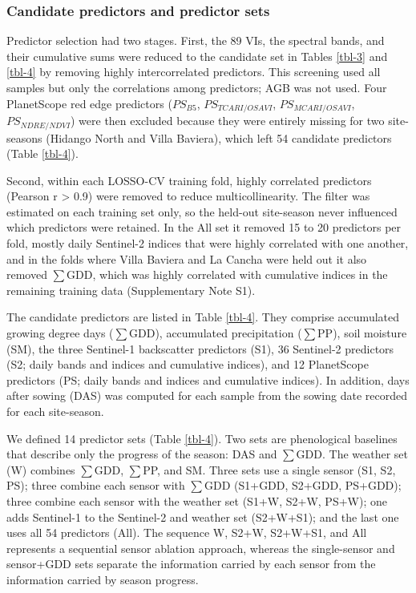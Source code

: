 \documentclass[
  english,
  review,
  number,
  sort,compress,
  authoryear,
  3p]{elsarticle}
\begin{document}
\subsubsection{Candidate predictors and predictor
sets}\label{candidate-predictors-and-predictor-sets}

Predictor selection had two stages. First, the 89 VIs, the spectral
bands, and their cumulative sums were reduced to the candidate set in
Tables \ref{tbl-3} and \ref{tbl-4} by removing highly intercorrelated
predictors. This screening used all samples but only the correlations
among predictors; AGB was not used. Four PlanetScope red edge predictors
(\(PS_{B5}\), \(PS_{TCARI/OSAVI}\), \(PS_{MCARI/OSAVI}\),
\(PS_{NDRE/NDVI}\)) were then excluded because they were entirely
missing for two site-seasons (Hidango North and Villa Baviera), which
left 54 candidate predictors (Table \ref{tbl-4}).

Second, within each LOSSO-CV training fold, highly correlated predictors
(Pearson r \textgreater{} 0.9) were removed to reduce multicollinearity.
The filter was estimated on each training set only, so the held-out
site-season never influenced which predictors were retained. In the All
set it removed 15 to 20 predictors per fold, mostly daily Sentinel-2
indices that were highly correlated with one another, and in the folds
where Villa Baviera and La Cancha were held out it also removed
\(\sum\)GDD, which was highly correlated with cumulative indices in the
remaining training data (Supplementary Note S1).

The candidate predictors are listed in Table \ref{tbl-4}. They comprise
accumulated growing degree days (\(\sum\)GDD), accumulated precipitation
(\(\sum\)PP), soil moisture (SM), the three Sentinel-1 backscatter
predictors (S1), 36 Sentinel-2 predictors (S2; daily bands and indices
and cumulative indices), and 12 PlanetScope predictors (PS; daily bands
and indices and cumulative indices). In addition, days after sowing
(DAS) was computed for each sample from the sowing date recorded for
each site-season.

We defined 14 predictor sets (Table \ref{tbl-4}). Two sets are
phenological baselines that describe only the progress of the season:
DAS and \(\sum\)GDD. The weather set (W) combines \(\sum\)GDD,
\(\sum\)PP, and SM. Three sets use a single sensor (S1, S2, PS); three
combine each sensor with \(\sum\)GDD (S1+GDD, S2+GDD, PS+GDD); three
combine each sensor with the weather set (S1+W, S2+W, PS+W); one adds
Sentinel-1 to the Sentinel-2 and weather set (S2+W+S1); and the last one
uses all 54 predictors (All). The sequence W, S2+W, S2+W+S1, and All
represents a sequential sensor ablation approach, whereas the
single-sensor and sensor+GDD sets separate the information carried by
each sensor from the information carried by season progress.
\end{document}
